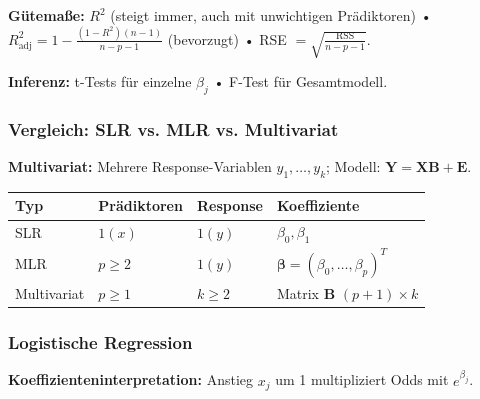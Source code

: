 \textbf{Gütemaße:} $R^2$ (steigt immer, auch mit unwichtigen Prädiktoren) • $R^2_{\text{adj}} = 1 - \frac{(1-R^2)(n-1)}{n-p-1}$ (bevorzugt) • RSE $= \sqrt{\frac{\text{RSS}}{n-p-1}}$.

\textbf{Inferenz:} t-Tests für einzelne $\beta_j$ • F-Test für Gesamtmodell.

\subsubsection{Vergleich: SLR vs. MLR vs. Multivariat}

\textbf{Multivariat:} Mehrere Response-Variablen $y_1, \ldots, y_k$; Modell: $\mathbf{Y} = \mathbf{X}\mathbf{B} + \mathbf{E}$.
\begin{center}
    \small
    \begin{tabular}{|l|l|l|l|}
        \hline
        \textbf{Typ} & \textbf{Prädiktoren} & \textbf{Response} & \textbf{Koeffiziente}                               \\
        \hline
        SLR          & $1 (x)$               & $1 (y)$           & $\beta_0, \beta_1$                                  \\
        \hline
        MLR          & $p \geq 2$           & $1 (y)$           & $\boldsymbol{\beta} = (\beta_0, \ldots, \beta_p)^T$ \\
        \hline
        Multivariat  & $p \geq 1$           & $k \geq 2$        & Matrix $\mathbf{B}$ $(p+1) \times k$                \\
        \hline
    \end{tabular}
\end{center}

\subsubsection{Logistische Regression}



\textbf{Koeffizienteninterpretation:} Anstieg $x_j$ um 1 multipliziert Odds mit $e^{\beta_j}$.

